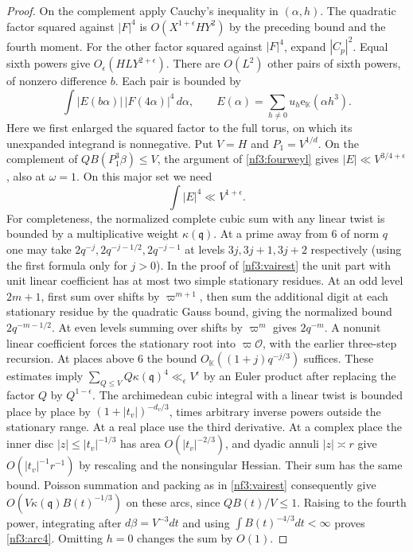 \documentclass[11pt,letterpaper]{article}
\theoremstyle{definition}
\numberwithin{equation}{section}
\begin{document}
\begin{proof}
On the complement apply Cauchy's inequality in $(\alpha,h)$.
The quadratic factor squared against $|F|^4$ is
$O(X^{1+\epsilon} H Y^2)$ by the preceding bound and the fourth moment.
For the other factor squared against $|F|^4$, expand $|C_p|^2$.
Equal sixth powers give $O_\epsilon(H L Y^{2+\epsilon})$. There are
$O(L^2)$ other pairs of sixth powers, of nonzero difference $b$. Each
pair is bounded by
\[
       \int |E(b\alpha)|\,|F(4\alpha)|^4\,d\alpha ,
 \qquad E(\alpha)=\sum_{h\ne0}u_h\mathrm e_{\mathbb K}(\alpha h^3).
\]
Here we first enlarged the squared factor to the full torus, on which
its unexpanded integrand is nonnegative. Put $V=H$ and $P_1=V^{1/d}$.
On the complement of $Q B(P_1^3\beta)\le V$, the argument of
\eqref{nf3:fourweyl} gives $|E|\ll V^{3/4+\epsilon}$, also at
$\omega=1$. On this major set we need
\begin{equation}\label{nf3:arc4}
                      \int |E|^4\ll V^{1+\epsilon}.
\end{equation}
For completeness, the normalized complete cubic sum with any linear
twist is bounded by a multiplicative weight $\kappa(\mathfrak q)$.
At a prime away from $6$ of norm $q$ one may take
$2q^{-j},2q^{-j-1/2},2q^{-j-1}$ at levels $3j,3j+1,3j+2$
respectively (using the first formula only for $j>0$). In the
proof of \eqref{nf3:vairest} the unit part with unit linear coefficient
has at most two simple stationary residues. At an odd level $2m+1$,
first sum over shifts by $\varpi^{m+1}$, then sum the additional
digit at each stationary residue by the quadratic Gauss bound, giving
the normalized bound $2q^{-m-1/2}$. At even levels summing over
shifts by $\varpi^m$ gives $2q^{-m}$. A nonunit linear coefficient
forces the stationary root into $\varpi\mathcal O$, with the earlier
three-step recursion. At places above $6$ the bound
$O_{\mathbb K}((1+j)q^{-j/3})$ suffices. These estimates imply
$\sum_{Q\le V}Q\kappa(\mathfrak q)^4\ll_\epsilon V^\epsilon$ by an
Euler product after replacing the factor $Q$ by $Q^{1-\epsilon}$.
The archimedean cubic integral with a linear twist is bounded place
by place by $(1+|t_v|)^{-d_v/3}$, times arbitrary inverse powers
outside the stationary range. At a real place use the third derivative.
At a complex place the inner disc $|z|\le |t_v|^{-1/3}$ has area
$O(|t_v|^{-2/3})$, and dyadic annuli $|z|\asymp r$ give
$O(|t_v|^{-1}r^{-1})$ by rescaling and the nonsingular Hessian.
Their sum has the same bound. Poisson summation and packing as in
\eqref{nf3:vairest} consequently give
$O(V\kappa(\mathfrak q)B(t)^{-1/3})$ on these arcs, since
$Q B(t)/V\le1$. Raising to the fourth power, integrating after
$d\beta=V^{-3}dt$ and using $\int B(t)^{-4/3}dt<\infty$ proves
\eqref{nf3:arc4}. Omitting $h=0$ changes the sum by $O(1)$.


\end{proof}
\end{document}
